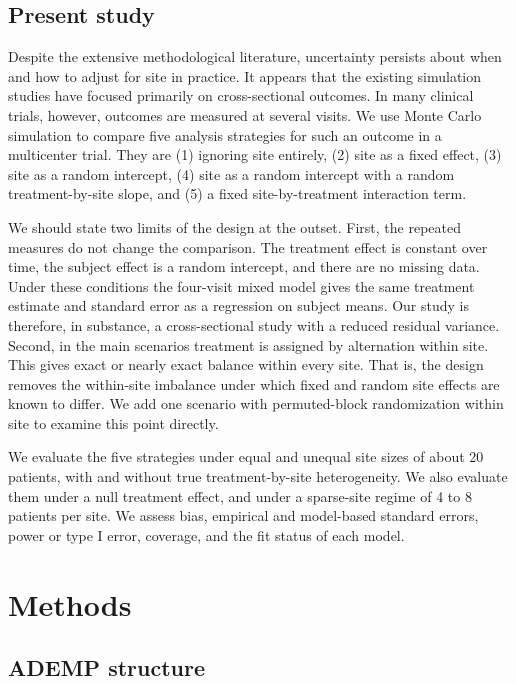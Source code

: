 \documentclass[
  11pt,
]{article}
\begin{document}
\subsection{Present study}\label{present-study}

Despite the extensive methodological literature, uncertainty
persists about when and how to adjust for site in practice. It
appears that the existing simulation studies have focused
primarily on cross-sectional outcomes. In many clinical trials,
however, outcomes are measured at several visits. We use Monte
Carlo simulation to compare five analysis strategies for such an
outcome in a multicenter trial. They are (1) ignoring site
entirely, (2) site as a fixed effect, (3) site as a random
intercept, (4) site as a random intercept with a random
treatment-by-site slope, and (5) a fixed site-by-treatment
interaction term.

We should state two limits of the design at the outset. First,
the repeated measures do not change the comparison. The treatment
effect is constant over time, the subject effect is a random
intercept, and there are no missing data. Under these conditions
the four-visit mixed model gives the same treatment estimate and
standard error as a regression on subject means. Our study is
therefore, in substance, a cross-sectional study with a reduced
residual variance. Second, in the main scenarios treatment is
assigned by alternation within site. This gives exact or nearly
exact balance within every site. That is, the design removes the
within-site imbalance under which fixed and random site effects
are known to differ. We add one scenario with permuted-block
randomization within site to examine this point directly.

We evaluate the five strategies under equal and unequal site sizes
of about 20 patients, with and without true treatment-by-site
heterogeneity. We also evaluate them under a null treatment
effect, and under a sparse-site regime of 4 to 8 patients per
site. We assess bias, empirical and model-based standard errors,
power or type I error, coverage, and the fit status of each model.

\section{Methods}\label{methods}

\subsection{ADEMP structure}\label{ademp-structure}
\end{document}
